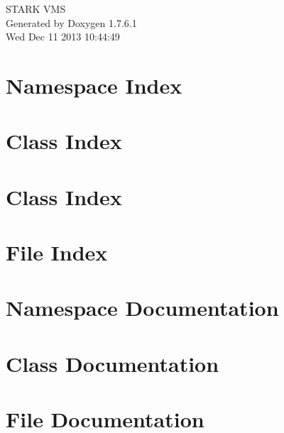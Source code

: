 \documentclass[a4paper]{book}
\begin{document}
\hypersetup{pageanchor=false,citecolor=blue}
\begin{titlepage}
\vspace*{7cm}
\begin{center}
{\Large \-S\-T\-A\-R\-K \-V\-M\-S }\\
\vspace*{1cm}
{\large \-Generated by Doxygen 1.7.6.1}\\
\vspace*{0.5cm}
{\small Wed Dec 11 2013 10:44:49}\\
\end{center}
\end{titlepage}
\clearemptydoublepage
{}
\tableofcontents
\clearemptydoublepage
{}
\hypersetup{pageanchor=true,citecolor=blue}
\chapter{\-Namespace \-Index}

\chapter{\-Class \-Index}

\chapter{\-Class \-Index}

\chapter{\-File \-Index}

\chapter{\-Namespace \-Documentation}





\chapter{\-Class \-Documentation}














\chapter{\-File \-Documentation}















\printindex
\end{document}
